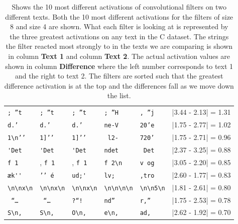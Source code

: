 \begin{table}
\begin{tabular}{lll|lll}
        \verb[; ”t[       & \verb[; ”t[       & \verb[; ”t[          &
        \verb'; ”H'       & \verb', ”j'       & |3.44 - 2.13| = 1.31 \\

        \verb[d.’ [       & \verb[d.’ [       & \verb[d.’ [          &
        \verb'ne-V'       & \verb'20’e'       & |1.75 - 2.77| = 1.02 \\

        \verb[1\n’’[      & \verb[1]’’[       & \verb[1]’’[          &
        \verb' l2-'       & \verb'720’'       & |1.75 - 2.71| = 0.96 \\

        \verb['Det[       & \verb['Det[       & \verb['Det[          &
        \verb'ndet'       & \verb' Det'       & |2.37 - 3.25| = 0.88 \\

        \verb[f 1[        &, \verb[f 1[       &, \verb[f 1[          &
        \verb'f 2\n'      & \verb'v og'       & |3.05 - 2.20| = 0.85 \\

        \verb[æk''[       & \verb[’’ é[       & \verb[ud;'[          &
        \verb'lv; '       & \verb',tro'       & |2.60 - 1.77| = 0.83 \\

        \verb[\n\nx\n[    & \verb[\n\nx\n[    & \verb[\n\nx\n[       &
        \verb'\n\n\n\n'   & \verb'\n\n5\n'    & |1.81 - 2.61| = 0.80 \\

        \verb[ “… [       & \verb[ “… [       & \verb[?“! [          &
        \verb'nd” '       & \verb'r,” '       & |1.75 - 2.53| = 0.78 \\

        \verb[S\n, [      & \verb[S\n, [      & \verb[O\n, [         &
        \verb'e\n, '      & \verb'ad, '       & |2.62 - 1.92| = 0.70 \\
    \end{tabular}
    \caption{Shows the 10 most different activations of convolutional filters on
        two different texts. Both the 10 most different activations for the
        filters of size 8 and size 4 are shown. What each filter is looking at is
        represented by the three greatest activations on any text in the \gls{C}
        dataset. The strings the filter reacted most strongly to in the texts we
        are comparing is shown in column \textbf{Text 1} and column \textbf{Text
        2}. The actual activation values are shown in column \textbf{Difference}
        where the left number corresponds to text 1 and the right to text 2. The
        filters are sorted such that the greatest difference activation is at
        the top and the differences fall as we move down the list.}
    \label{tab:teacher_feedback_output}
\end{table}

